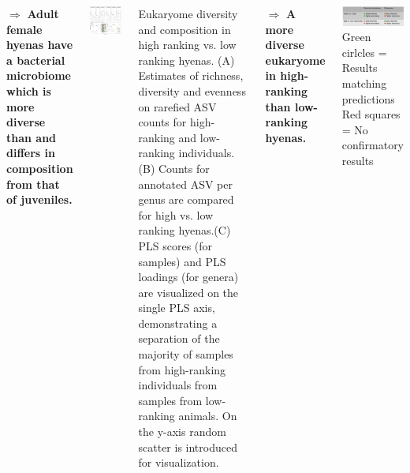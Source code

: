 \documentclass[30pt, a0paper, portrait, margin=0mm, innermargin=15mm,
               blockverticalspace=15mm, colspace=15mm, subcolspace=8mm]{tikzposter}
\begin{document}
\begin{columns}
{\begin{minipage}{0.5\linewidth}
  \end{minipage}
  $\Rightarrow$ \textbf{Adult female hyenas have a bacterial microbiome which
  is more diverse than and differs in composition from that of
  juveniles.}
  }

 {
  \begin{minipage}{0.5\linewidth}                  
    \includegraphics[scale=0.45]{Figure4_man.png}
  \end{minipage}
  \hfill
  \begin{minipage}{0.5\linewidth}
     Eukaryome diversity and composition in high
    ranking vs. low ranking hyenas. (A) Estimates of richness,
    diversity and evenness on rarefied ASV counts for high-ranking and
    low-ranking individuals. (B) Counts for annotated ASV per genus
    are compared for high vs. low ranking hyenas.(C) PLS scores (for
    samples) and PLS loadings (for genera) are visualized on the
    single PLS axis, demonstrating a separation of the majority of
    samples from high-ranking individuals from samples from
    low-ranking animals.  On the y-axis random scatter is introduced
    for visualization.
  \end{minipage}
  $\Rightarrow$ \textbf{A more diverse eukaryome in high-ranking than
    low-ranking hyenas.} }


{
    \includegraphics[scale=0.85]{summary.png}\\
    Green cirlcles = Results matching predictions \hspace{1cm}
    Red squares = No confirmatory results
}


\end{columns}
\end{document}
